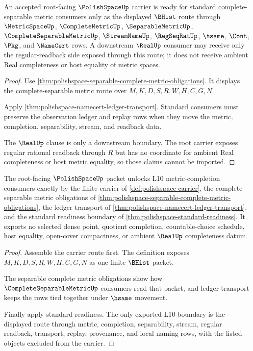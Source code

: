 \begin{theorem}
\label{thm:polishspace-standard-readiness}
An accepted root-facing $\PolishSpaceUp$ carrier is ready for standard
complete-separable metric consumers only as the displayed $\BHist$ route
through $\MetricSpaceUp$, $\CompleteMetricUp$, $\SeparableMetricUp$,
$\CompleteSeparableMetricUp$, $\StreamNameUp$, $\RegSeqRatUp$, $\hsame$,
$\Cont$, $\Pkg$, and $\NameCert$ rows. A downstream $\RealUp$ consumer may
receive only the regular-readback side exposed through this route; it does not
receive ambient Real completeness or host equality of metric spaces.
\end{theorem}
\begin{proof}
Use \autoref{thm:polishspace-separable-complete-metric-obligations}. It
displays the complete-separable metric route over $M,K,D,S,R,W,H,C,G,N$.

Apply \autoref{thm:polishspace-namecert-ledger-transport}. Standard consumers
must preserve the observation ledger and replay rows when they move the metric,
completion, separability, stream, and readback data.

The $\RealUp$ clause is only a downstream boundary. The root carrier exposes
regular rational readback through $R$ but has no coordinate for ambient Real
completeness or host metric equality, so those claims cannot be imported.
\end{proof}

\begin{theorem}
\label{thm:polishspace-l10-root-unblock-package}
The root-facing $\PolishSpaceUp$ packet unlocks L10 metric-completion
consumers exactly by the finite carrier of \autoref{def:polishspace-carrier},
the complete-separable metric obligations of
\autoref{thm:polishspace-separable-complete-metric-obligations}, the ledger
transport of \autoref{thm:polishspace-namecert-ledger-transport}, and the
standard readiness boundary of \autoref{thm:polishspace-standard-readiness}.
It exports no selected dense point, quotient completion, countable-choice
schedule, host equality, open-cover compactness, or ambient $\RealUp$
completeness datum.
\end{theorem}
\begin{proof}
Assemble the carrier route first. The definition exposes $M,K,D,S,R,W,H,C,G,N$
as one finite $\BHist$ packet.

The separable complete metric obligations show how $\CompleteSeparableMetricUp$
consumers read that packet, and ledger transport keeps the rows tied together
under $\hsame$ movement.

Finally apply standard readiness. The only exported L10 boundary is the
displayed route through metric, completion, separability, stream, regular
readback, transport, replay, provenance, and local naming rows, with the listed
objects excluded from the carrier.
\end{proof}

